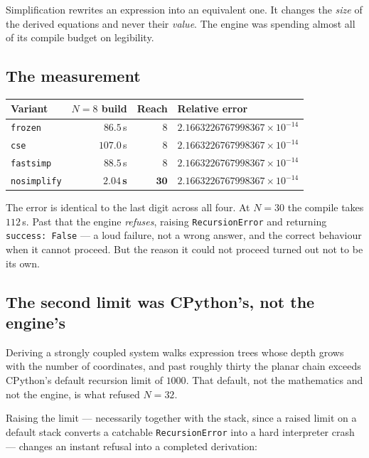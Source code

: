 \documentclass[11pt,a4paper]{article}
\newcommand{\code}[1]{\texttt{\small #1}}
\begin{document}
\noindent Simplification rewrites an expression into an equivalent one. It
changes the \emph{size} of the derived equations and never their \emph{value}.
The engine was spending almost all of its compile budget on legibility.

\subsection{The measurement}
\begin{center}
\begin{tabular}{@{}lrrl@{}}
\toprule
\textbf{Variant} & \textbf{$N=8$ build} & \textbf{Reach} & \textbf{Relative error} \\
\midrule
\code{frozen}     & $86.5$\,s & $8$  & $2.1663226767998367\times10^{-14}$ \\
\code{cse}        & $107.0$\,s & $8$  & $2.1663226767998367\times10^{-14}$ \\
\code{fastsimp}   & $88.5$\,s & $8$  & $2.1663226767998367\times10^{-14}$ \\
\code{nosimplify} & $\mathbf{2.04}$\,\textbf{s} & $\mathbf{30}$ & $2.1663226767998367\times10^{-14}$ \\
\bottomrule
\end{tabular}
\end{center}

\noindent The error is identical to the last digit across all four. At $N=30$
the compile takes $112$\,s. Past that the engine \emph{refuses}, raising
\code{RecursionError} and returning \code{success: False} --- a loud failure,
not a wrong answer, and the correct behaviour when it cannot proceed. But the
reason it could not proceed turned out not to be its own.

\subsection{The second limit was CPython's, not the engine's}
Deriving a strongly coupled system walks expression trees whose depth grows
with the number of coordinates, and past roughly thirty the planar chain
exceeds CPython's default recursion limit of $1000$. That default, not the
mathematics and not the engine, is what refused $N=32$.

Raising the limit --- necessarily together with the stack, since a raised limit
on a default stack converts a catchable \code{RecursionError} into a hard
interpreter crash --- changes an instant refusal into a completed derivation:
\end{document}
